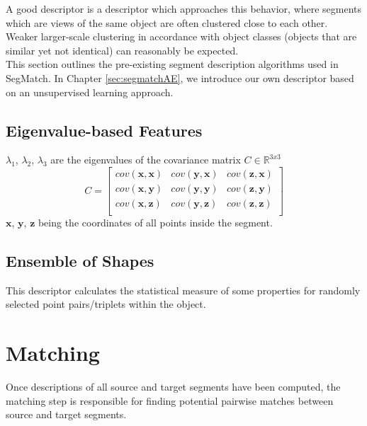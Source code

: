A good descriptor is a descriptor which approaches this behavior, where segments which are views of the same object are often clustered close to each other. Weaker larger-scale clustering in accordance with object classes (objects that are similar yet not identical) can reasonably be expected.\\

This section outlines the pre-existing segment description algorithms used in SegMatch. In Chapter \ref{sec:segmatchAE}, we introduce our own descriptor based on an unsupervised learning approach.\\

\subsection{Eigenvalue-based Features}
\label{subsec:eigenvalues}

$\lambda_1$, $\lambda_2$, $\lambda_3$ are the eigenvalues of the covariance matrix $C \in \mathbb{R}^{3x3}$
$$
C = 
\begin{bmatrix}
  cov(\textbf{x},\textbf{x}) & cov(\textbf{y},\textbf{x}) & cov(\textbf{z},\textbf{x})  \\
  cov(\textbf{x},\textbf{y}) & cov(\textbf{y},\textbf{y}) & cov(\textbf{z},\textbf{y})  \\
  cov(\textbf{x},\textbf{z}) & cov(\textbf{y},\textbf{z}) & cov(\textbf{z},\textbf{z})  \\
\end{bmatrix} 
$$
$\textbf{x}$, $\textbf{y}$, $\textbf{z}$ being the coordinates of all points inside the segment.

\subsection{Ensemble of Shapes}
\label{subsec:ensemble-of-shapes}

This descriptor calculates the statistical measure of some properties for randomly selected point pairs/triplets within the object.\\

\section{Matching}
\label{sec:matching}

Once descriptions of all source and target segments have been computed, the matching step is responsible for finding potential pairwise matches between source and target segments.\\ 

